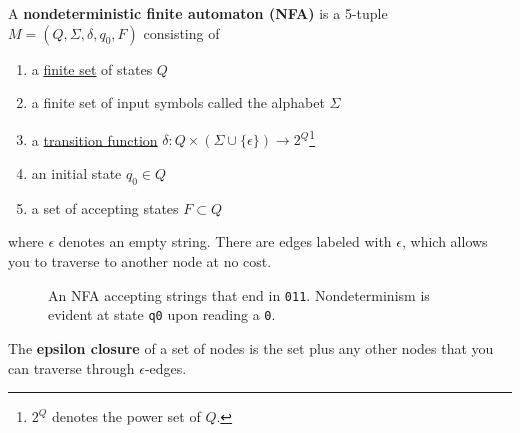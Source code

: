   \begin{definition}
    \label{def:nondeterministic-finite-automaton}
    A \textbf{nondeterministic finite automaton (NFA)} is a 5-tuple $M = (Q, \Sigma, \delta, q_0, F)$ consisting of 
    \begin{enumerate}
      \item a \hyperref[st-def:finite-set]{finite set} of states $Q$
      \item a finite set of input symbols called the alphabet $\Sigma$
      \item a \hyperref[sm-def:transition-function]{transition function} $\delta: Q \times (\Sigma \cup \{\epsilon\}) \to 2^Q$\footnote{$2^Q$ denotes the power set of $Q$.}
      \item an initial state $q_0 \in Q$ 
      \item a set of accepting states $F \subset Q$
    \end{enumerate}
    where $\epsilon$ denotes an empty string. There are edges labeled with $\epsilon$, which allows you to traverse to another node at no cost. 

    \begin{figure}[H]
      \centering
      \caption{An NFA accepting strings that end in \texttt{011}. Nondeterminism is evident at state \texttt{q0} upon reading a \texttt{0}.}
      \label{fig:nfa_endswith011}
    \end{figure}

    The \textbf{epsilon closure} of a set of nodes is the set plus any other nodes that you can traverse through $\epsilon$-edges. 
  \end{definition} 

